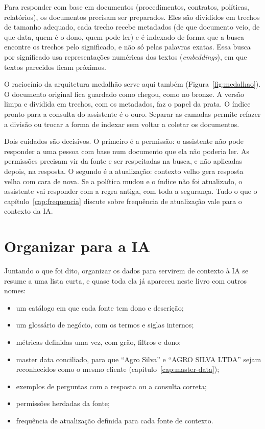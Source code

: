 Para responder com base em documentos (procedimentos, contratos, políticas, relatórios), os
documentos precisam ser preparados. Eles são divididos em trechos de tamanho adequado, cada
trecho recebe metadados (de que documento veio, de que data, quem é o dono, quem pode ler) e
é indexado de forma que a busca encontre os trechos pelo significado, e não só pelas
palavras exatas. Essa busca por significado usa representações numéricas dos textos
(\emph{embeddings}), em que textos parecidos ficam próximos.

O raciocínio da arquitetura medalhão serve aqui também (Figura~\ref{fig:medalhao}). O
documento original fica guardado como chegou, como no bronze. A versão limpa e dividida em
trechos, com os metadados, faz o papel da prata. O índice pronto para a consulta do
assistente é o ouro. Separar as camadas permite refazer a divisão ou trocar a forma de
indexar sem voltar a coletar os documentos.

Dois cuidados são decisivos. O primeiro é a permissão: o assistente não pode responder a uma
pessoa com base num documento que ela não poderia ler. As permissões precisam vir da fonte e
ser respeitadas na busca, e não aplicadas depois, na resposta. O segundo é a atualização:
contexto velho gera resposta velha com cara de nova. Se a política mudou e o índice não foi
atualizado, o assistente vai responder com a regra antiga, com toda a segurança. Tudo o que o
capítulo~\ref{cap:frequencia} discute sobre frequência de atualização vale para o contexto da
IA.

\section{Organizar para a IA}
\label{sec:organizar-para-ia}

Juntando o que foi dito, organizar os dados para servirem de contexto à IA se resume a uma
lista curta, e quase toda ela já apareceu neste livro com outros nomes:

\begin{itemize}
  \item um catálogo em que cada fonte tem dono e descrição;
  \item um glossário de negócio, com os termos e siglas internos;
  \item métricas definidas uma vez, com grão, filtros e dono;
  \item master data conciliado, para que \enquote{Agro Silva} e \enquote{AGRO SILVA LTDA}
    sejam reconhecidos como o mesmo cliente (capítulo~\ref{cap:master-data});
  \item exemplos de perguntas com a resposta ou a consulta correta;
  \item permissões herdadas da fonte;
  \item frequência de atualização definida para cada fonte de contexto.
\end{itemize}

